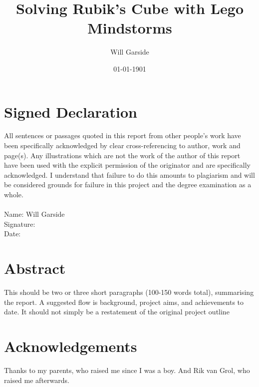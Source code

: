 \documentclass{report}
\title{Solving Rubik's Cube with Lego Mindstorms}
\date{01-01-1901}
\author{Will Garside}
\begin{document}
		
	\maketitle
	\newpage
	
	\section*{Signed Declaration}
	All sentences or passages quoted in this report from other people's work have been specifically acknowledged by clear cross-referencing to author, work and page(s). Any illustrations which are not the work of the author of this report have been used with the explicit permission of the originator and are specifically acknowledged. I understand that failure to do this amounts to plagiarism and will be considered grounds for failure in this project and the degree examination as a whole.
	\\
	\\Name: Will Garside
	\\Signature:
	\\Date: 

	\newpage
	\section*{Abstract}
	This should be two or three short paragraphs (100-150 words total), summarising the report. A suggested flow is background, project aims, and achievements to date. It should not simply be a restatement of the original project outline
	
	\newpage
	\section*{Acknowledgements}
	Thanks to my parents, who raised me since I was a boy. And Rik van Grol, who raised me afterwards.
	
	\newpage
\end{document}
